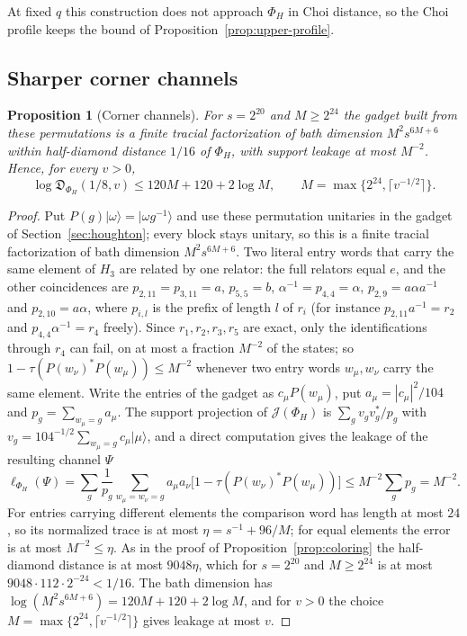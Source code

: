 \documentclass[11pt,a4paper]{article}
\theoremstyle{plain}
\newtheorem{proposition}[theorem]{Proposition}
\theoremstyle{definition}
\theoremstyle{remark}
\newcommand{\Dsupp}{\mathfrak{D}}
\begin{document}
At fixed $q$ this construction does not approach $\Phi_H$ in Choi distance, so the Choi profile keeps the bound of
Proposition~\ref{prop:upper-profile}.


\subsection{Sharper corner channels}\label{app:corner-channels}


\begin{proposition}[Corner channels]\label{prop:corner-channel}
For $s=2^{20}$ and $M\ge2^{24}$ the gadget built from these permutations is a finite tracial factorization of bath dimension
$M^2s^{6M+6}$ within half-diamond distance $1/16$ of $\Phi_H$, with support leakage at most $M^{-2}$. Hence, for every $v>0$,
\[
\log\Dsupp_{\Phi_H}(1/8,v)\le120M+120+2\log M,\qquad M=\max\{2^{24},\lceil v^{-1/2}\rceil\}.
\]
\end{proposition}

\begin{proof}
Put $P(g)|\omega\rangle=|\omega g^{-1}\rangle$ and use these permutation unitaries in the gadget of
Section~\ref{sec:houghton}; every block stays unitary, so this is a finite tracial factorization of bath dimension $M^2s^{6M+6}$. Two
literal entry words that carry the same element of $H_3$ are related by one relator: the full relators equal $e$, and the other
coincidences are $p_{2,11}=p_{3,11}=a$, $p_{5,5}=b$, $\alpha^{-1}=p_{4,4}=\alpha$, $p_{2,9}=a\alpha a^{-1}$ and $p_{2,10}=a\alpha$, where
$p_{i,l}$ is the prefix of length $l$ of $r_i$ (for instance $p_{2,11}a^{-1}=r_2$ and $p_{4,4}\alpha^{-1}=r_4$ freely). Since
$r_1,r_2,r_3,r_5$ are exact, only the identifications through $r_4$ can fail, on at most a fraction $M^{-2}$ of the states; so
$1-\tau(P(w_\nu)^*P(w_\mu))\le M^{-2}$ whenever two entry words $w_\mu,w_\nu$ carry the same element. Write the entries of the gadget as
$c_\mu P(w_\mu)$, put $a_\mu=|c_\mu|^2/104$ and $p_g=\sum_{w_\mu=g}a_\mu$. The support projection of $\mathcal J(\Phi_H)$ is
$\sum_gv_gv_g^*/p_g$ with $v_g=104^{-1/2}\sum_{w_\mu=g}c_\mu|\mu\rangle$, and a direct computation gives the leakage of the resulting channel $\Psi$
\[
\ell_{\Phi_H}(\Psi)=\sum_g\frac1{p_g}\sum_{w_\mu=w_\nu=g}a_\mu a_\nu\big[1-\tau(P(w_\nu)^*P(w_\mu))\big]\le M^{-2}\sum_gp_g=M^{-2}.
\]
For entries carrying different elements the comparison word has length at most $24$, so its normalized trace is at most
$\eta=s^{-1}+96/M$; for equal elements the error is at most $M^{-2}\le\eta$. As in the proof of Proposition~\ref{prop:coloring} the
half-diamond distance is at most $9048\eta$, which for $s=2^{20}$ and $M\ge2^{24}$ is at most $9048\cdot112\cdot2^{-24}<1/16$. The bath
dimension has $\log(M^2s^{6M+6})=120M+120+2\log M$, and for $v>0$ the choice $M=\max\{2^{24},\lceil v^{-1/2}\rceil\}$ gives leakage at
most $v$.
\end{proof}
\end{document}
